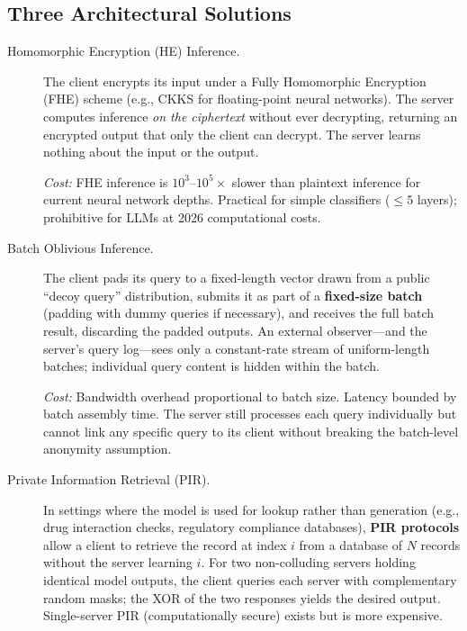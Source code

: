 \subsection{Three Architectural Solutions}
\label{subsec:oblivious_solutions}

\begin{description}
  \item[Homomorphic Encryption (HE) Inference.]
    The client encrypts its input under a Fully Homomorphic Encryption (FHE) scheme (e.g., CKKS for floating-point neural networks). The server computes inference \emph{on the ciphertext} without ever decrypting, returning an encrypted output that only the client can decrypt. The server learns nothing about the input or the output.

    \emph{Cost:} FHE inference is $10^3$--$10^5\times$ slower than plaintext inference for current neural network depths. Practical for simple classifiers ($\leq 5$ layers); prohibitive for LLMs at 2026 computational costs.

  \item[Batch Oblivious Inference.]
    The client pads its query to a fixed-length vector drawn from a public ``decoy query'' distribution, submits it as part of a \textbf{fixed-size batch} (padding with dummy queries if necessary), and receives the full batch result, discarding the padded outputs. An external observer---and the server's query log---sees only a constant-rate stream of uniform-length batches; individual query content is hidden within the batch.

    \emph{Cost:} Bandwidth overhead proportional to batch size. Latency bounded by batch assembly time. The server still processes each query individually but cannot link any specific query to its client without breaking the batch-level anonymity assumption.

  \item[Private Information Retrieval (PIR).]
    In settings where the model is used for lookup rather than generation (e.g., drug interaction checks, regulatory compliance databases), \textbf{PIR protocols} \cite{chor1998} allow a client to retrieve the record at index $i$ from a database of $N$ records without the server learning $i$. For two non-colluding servers holding identical model outputs, the client queries each server with complementary random masks; the XOR of the two responses yields the desired output. Single-server PIR (computationally secure) exists but is more expensive.
\end{description}

